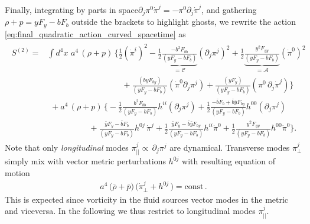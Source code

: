 Finally, integrating by parts in space $\partial_j \pi^0\dot{\pi}^j=-\pi^0\partial_j\dot{\pi}^j$, and gathering $\rho+p=yF_y-bF_b$ outside the brackets to highlight ghosts, we rewrite the action \eqref{eq:final_quadratic_action_curved_spacetime} as
{\small\begin{align}\label{eq:integrating_part_space_quadratic_action}
\begin{aligned}
    S^{(2)}= &\int d^4x\,\,a^4\, (\rho+p)\,\bigg\{
    \tfrac12 (\dot{\pi}^i)^2-\tfrac12 \underbrace{\tfrac{-b^2 F_{bb}}{(yF_y-bF_b)}}_{=\mathcal{C}} (\partial_j \pi^j)^2
    +\tfrac12 \underbrace{\tfrac{y^2 F_{yy}}{(yF_y-bF_b)}}_{=\mathcal{A}} (\dot{\pi}^0)^2 \\
    &\quad\qquad\qquad\qquad\qquad+ \tfrac{(b y F_{by})}{(yF_y-bF_b)} (\dot{\pi}^0 \partial_j \pi^j)+\tfrac{(yF_y)}{(yF_y-bF_b)} (\pi^0\,\partial_j\dot{\pi}^j)
    \bigg\}\\
    & \,\,+ a^4\, (\rho+p)\, \bigg\{
    -\tfrac12\!\tfrac{b^2 F_{bb}}{(yF_y-bF_b)} h^{ii}(\partial_j \pi^j)
    + \tfrac12\!\tfrac{-\bar{b}F_b + \bar{b}\bar{y}F_{by}}{(yF_y-bF_b)} h^{00}(\partial_j \pi^j)\\
    &\quad\qquad\qquad+ \tfrac{\bar{y}F_y - \bar{b}F_b}{(yF_y-bF_b)} h^{0 j}\,\dot{\pi}^j + \tfrac12\!\tfrac{\bar{y}F_y - \bar{b}\bar{y}F_{by}}{(yF_y-bF_b)} h^{ii}\dot{\pi}^0
    + \tfrac12\!\tfrac{y^2 F_{yy}}{(yF_y-bF_b)} h^{00}\dot{\pi}^0
    \bigg\}.
\end{aligned}
\end{align}}
Note that only \emph{longitudinal} modes $\pi^j_{||}\propto\, \partial_j\pi^j$ are dynamical.
Transverse modes $\pi^j_{\perp}$ simply mix with vector metric perturbations $h^{0j}$ with resulting equation of motion
{\small\begin{align}\label{eq:eom_transverse_phonons}
    a^4\,\big(\bar{\rho}+\bar{p}\big)\,\big(\dot{\pi}_\perp^j + h^{0j}\,\big)=\text{const}\,.
\end{align}}
This is expected since vorticity in the fluid sources vector modes in the metric and viceversa.
In the following we thus restrict to longitudinal modes $\pi_{||}^j$.

